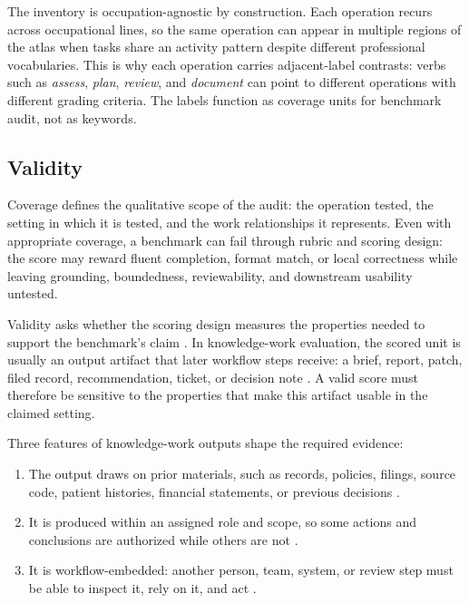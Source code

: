 \documentclass{article}
\begin{document}
The inventory is occupation-agnostic by construction.
Each operation recurs across occupational lines, so the same operation can appear in multiple regions of the atlas when tasks share an activity pattern despite different professional vocabularies.
This is why each operation carries adjacent-label contrasts: verbs such as \emph{assess}, \emph{plan}, \emph{review}, and \emph{document} can point to different operations with different grading criteria.
The labels function as coverage units for benchmark audit, not as keywords.

\subsection{Validity}
\label{sec:validity-axis}

Coverage defines the qualitative scope of the audit: the operation tested, the setting in which it is tested, and the work relationships it represents.
Even with appropriate coverage, a benchmark can fail through rubric and scoring design: the score may reward fluent completion, format match, or local correctness while leaving grounding, boundedness, reviewability, and downstream usability untested.

Validity asks whether the scoring design measures the properties needed to support the benchmark's claim \citep{messick1989validity,Messick1995,aera2014standards,kane2013validating,jacobs2021measurement}.
In knowledge-work evaluation, the scored unit is usually an output artifact that later workflow steps receive: a brief, report, patch, filed record, recommendation, ticket, or decision note \citep{suchman1987plans,suchman2007humanmachine,carlile2002pragmatic,carlile2004transferring}.
A valid score must therefore be sensitive to the properties that make this artifact usable in the claimed setting.

Three features of knowledge-work outputs shape the required evidence:

\begin{enumerate}[label=(\roman*), leftmargin=*, nosep]
    \item The output draws on prior materials, such as records, policies, filings, source code, patient histories, financial statements, or previous decisions \citep{davenport2005thinking,carlile2002pragmatic,carlile2004transferring}.
    \item It is produced within an assigned role and scope, so some actions and conclusions are authorized while others are not \citep{drucker1967effective,simon1957admin,abbott1988system,freidson2001professionalism}.
    \item It is workflow-embedded: another person, team, system, or review step must be able to inspect it, rely on it, and act \citep{suchman1987plans,suchman2007humanmachine,carlile2002pragmatic,carlile2004transferring}.
\end{enumerate}
\end{document}
